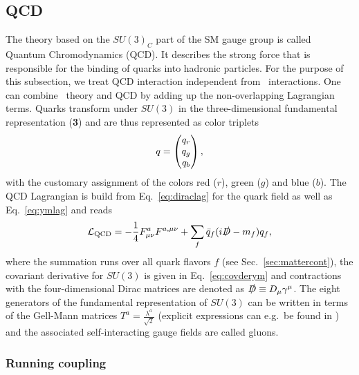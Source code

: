 \subsection{QCD}
The theory based on the $SU(3)_C$ part of the SM gauge group is called
Quantum Chromodynamics (QCD). It describes the strong force that is
responsible for the binding of quarks into hadronic particles. For the
purpose of this subsection, we treat QCD interaction independent from \ew~interactions. One can combine \ew~theory and QCD by adding up
the non-overlapping Lagrangian terms. Quarks transform
under $SU(3)$ in the three-dimensional fundamental representation
(\textbf{3}) and are thus represented as color triplets
\begin{align}
  q = \pmqty{q_r\\q_g\\q_b},
\end{align}
with the customary assignment of the colors red ($r$), green ($g$) and blue ($b$). The QCD Lagrangian
is build from Eq.~\eqref{eq:diraclag} for the quark field as well as
Eq.~\eqref{eq:ymlag} and reads
\begin{align}\label{eq:qcdlag}
  \mathcal{L}_{\text{QCD}} = -\frac{1}{4}F^a_{\mu\nu}F^{a,\mu\nu} + \sum_f
  \bar{q}_f (i \slashed{D}  -m_f) q_f ,
\end{align}
where the summation runs over all quark flavors $f$ (see Sec.~\ref{sec:mattercont}), the covariant derivative for $SU(3)$ is given in Eq.~\eqref{eq:covderym} and contractions with the four-dimensional
Dirac matrices are denoted as $\slashed{D} \equiv D_\mu \gamma^\mu$. The eight generators of the fundamental
representation of $SU(3)$ can be written in terms of the Gell-Mann
matrices $T^a = \frac{\lambda^a}{\sqrt{2}}$ (explicit expressions can e.g.\ be
found in \cite{Schwartz:2013pla}) and the associated
self-interacting gauge fields are called gluons. 

\subsubsection{Running coupling}
\label{sec:runcoup}

